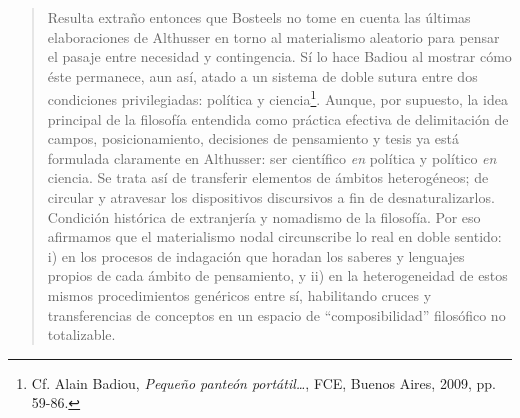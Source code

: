 \begin{quote}
Resulta extraño entonces que Bosteels no tome en cuenta las últimas elaboraciones de Althusser en torno al materialismo aleatorio para pensar el pasaje entre necesidad y contingencia. Sí lo hace Badiou al mostrar cómo éste permanece, aun así, atado  a un sistema de doble sutura entre dos condiciones privilegiadas: política y ciencia\footnote{Cf. Alain Badiou, \emph{Pequeño panteón portátil\ldots{}}, FCE, Buenos Aires, 2009, pp. 59-86.}. Aunque, por supuesto, la idea principal de la filosofía entendida como práctica efectiva de delimitación de campos, posicionamiento, decisiones de pensamiento y tesis ya está formulada claramente en Althusser: ser científico \emph{en} política y político \emph{en} ciencia. Se trata así de transferir elementos de ámbitos heterogéneos; de circular y atravesar los dispositivos discursivos a fin de desnaturalizarlos. Condición histórica de extranjería y nomadismo de la filosofía. Por eso afirmamos que el materialismo nodal circunscribe lo real en doble sentido: i) en los procesos de indagación que horadan los saberes y lenguajes propios de cada ámbito de pensamiento, y ii) en la heterogeneidad de estos mismos procedimientos genéricos entre sí, habilitando cruces y transferencias de conceptos en un espacio de \enquote{composibilidad} filosófico no totalizable.


\end{quote}
